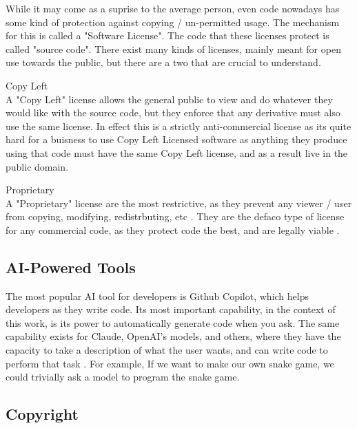\documentclass[journal]{IEEEtran}
\begin{document}
While it may come as a suprise to the average person,
even code nowadays has some kind of protection against
copying / un-permitted usage. The mechanism for this
is called a "Software License"\cite{Blackduck}.
The code that these licenses protect is called "source code".
There exist many kinds of licenses, mainly meant for
open use towards the public, but there are a two that are crucial to understand.

\begin{IEEEitemize}
\item Copy Left 
\\
  A "Copy Left" license allows the general public to view and do whatever they
  would like with the source code, but they enforce that any derivative must
  also use the same license. In effect this is a strictly anti-commercial license
  as its quite hard for a buisness to use Copy Left Licensed software as
  anything they produce using that code must have the same
  Copy Left license, and as a result live in the public domain.
  \cite{Blackduck}

\item Proprietary 
\\
A "Proprietary" license are the most restrictive, as they prevent any viewer / user from
copying, modifying, redistrbuting, etc \cite{Blackduck}. They are the defaco type of license for any
commercial code, as they protect code the best, and are legally viable \cite{harvard}. 
    
\end{IEEEitemize}



\subsection{AI-Powered Tools}

The most popular AI tool for developers is Github Copilot, which
helps developers as they write code. Its most important capability, in
the context of this work, is its power to automatically generate code when
you ask. The same capability exists for Claude, OpenAI's models, and others,
where they have the capacity to take a description of what the
user wants, and can write code to perform that task \cite{s_2023}. For example, If we
want to make our own snake game, we could trivially ask a model to
program the snake game.

\subsection{Copyright}
\end{document}
